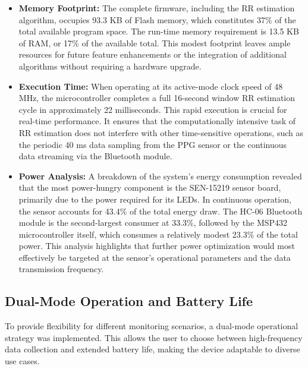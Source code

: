 \documentclass[12pt,a4paper]{report}
\begin{document}
\begin{itemize}
    \item \textbf{Memory Footprint:} The complete firmware, including the RR estimation algorithm, occupies 93.3 KB of Flash memory, which constitutes 37\% of the total available program space. The run-time memory requirement is 13.5 KB of RAM, or 17\% of the available total. This modest footprint leaves ample resources for future feature enhancements or the integration of additional algorithms without requiring a hardware upgrade.

    \item \textbf{Execution Time:} When operating at its active-mode clock speed of 48 MHz, the microcontroller completes a full 16-second window RR estimation cycle in approximately 22 milliseconds. This rapid execution is crucial for real-time performance. It ensures that the computationally intensive task of RR estimation does not interfere with other time-sensitive operations, such as the periodic 40 ms data sampling from the PPG sensor or the continuous data streaming via the Bluetooth module.

    \item \textbf{Power Analysis:} A breakdown of the system's energy consumption revealed that the most power-hungry component is the SEN-15219 sensor board, primarily due to the power required for its LEDs. In continuous operation, the sensor accounts for 43.4\% of the total energy draw. The HC-06 Bluetooth module is the second-largest consumer at 33.3\%, followed by the MSP432 microcontroller itself, which consumes a relatively modest 23.3\% of the total power. This analysis highlights that further power optimization would most effectively be targeted at the sensor's operational parameters and the data transmission frequency.
\end{itemize}

\subsection{Dual-Mode Operation and Battery Life}
 To provide flexibility for different monitoring scenarios, a dual-mode operational strategy was implemented. This allows the user to choose between high-frequency data collection and extended battery life, making the device adaptable to diverse use cases.
\end{document}

